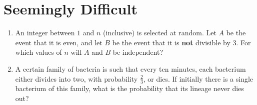\documentclass[svgnames]{amsart}
\begin{document}
\section{Seemingly Difficult}
\begin{enumerate}
\item An integer between $1$ and $n$ (inclusive) is selected at random. Let $A$ be the event that it is even, and let $B$ be the event that it is \textbf{not} divisible by $3$. For which values of $n$ will $A$ and $B$ be independent?

\item A certain family of bacteria is such that every ten minutes, each bacterium either divides into two, with probability $\frac 2 3$, or dies. If initially there is a single bacterium of this family, what is the probability that its lineage never dies out?
\end{enumerate} %
\end{document}
